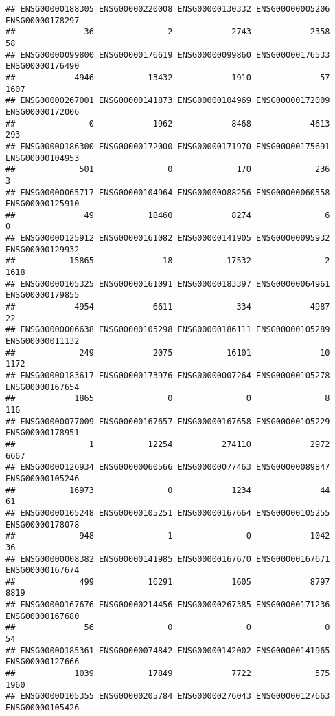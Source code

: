 \documentclass[
]{article}
\begin{document}
\begin{verbatim}
## ENSG00000188305 ENSG00000220008 ENSG00000130332 ENSG00000005206 ENSG00000178297 
##              36               2            2743            2358              58 
## ENSG00000099800 ENSG00000176619 ENSG00000099860 ENSG00000176533 ENSG00000176490 
##            4946           13432            1910              57            1607 
## ENSG00000267001 ENSG00000141873 ENSG00000104969 ENSG00000172009 ENSG00000172006 
##               0            1962            8468            4613             293 
## ENSG00000186300 ENSG00000172000 ENSG00000171970 ENSG00000175691 ENSG00000104953 
##             501               0             170             236               3 
## ENSG00000065717 ENSG00000104964 ENSG00000088256 ENSG00000060558 ENSG00000125910 
##              49           18460            8274               6               0 
## ENSG00000125912 ENSG00000161082 ENSG00000141905 ENSG00000095932 ENSG00000129932 
##           15865              18           17532               2            1618 
## ENSG00000105325 ENSG00000161091 ENSG00000183397 ENSG00000064961 ENSG00000179855 
##            4954            6611             334            4987              22 
## ENSG00000006638 ENSG00000105298 ENSG00000186111 ENSG00000105289 ENSG00000011132 
##             249            2075           16101              10            1172 
## ENSG00000183617 ENSG00000173976 ENSG00000007264 ENSG00000105278 ENSG00000167654 
##            1865               0               0               8             116 
## ENSG00000077009 ENSG00000167657 ENSG00000167658 ENSG00000105229 ENSG00000178951 
##               1           12254          274110            2972            6667 
## ENSG00000126934 ENSG00000060566 ENSG00000077463 ENSG00000089847 ENSG00000105246 
##           16973               0            1234              44              61 
## ENSG00000105248 ENSG00000105251 ENSG00000167664 ENSG00000105255 ENSG00000178078 
##             948               1               0            1042              36 
## ENSG00000008382 ENSG00000141985 ENSG00000167670 ENSG00000167671 ENSG00000167674 
##             499           16291            1605            8797            8819 
## ENSG00000167676 ENSG00000214456 ENSG00000267385 ENSG00000171236 ENSG00000167680 
##              56               0               0               0              54 
## ENSG00000185361 ENSG00000074842 ENSG00000142002 ENSG00000141965 ENSG00000127666 
##            1039           17849            7722             575            1960 
## ENSG00000105355 ENSG00000205784 ENSG00000276043 ENSG00000127663 ENSG00000105426 

\end{verbatim}
\end{document}
